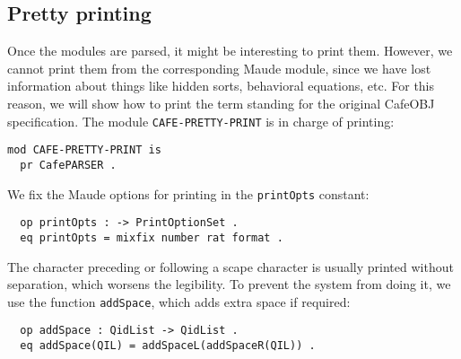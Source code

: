 \subsection{Pretty printing\label{subsec:pretty}}

Once the modules are parsed, it might be interesting to print them. However, we
cannot print them from the corresponding Maude module, since we have lost information
about things like hidden sorts, behavioral equations, etc. For this reason, we will
show how to print the term standing for the original CafeOBJ specification.
%
The module \verb"CAFE-PRETTY-PRINT" is in charge of printing:

{\codesize
\begin{verbatim}
mod CAFE-PRETTY-PRINT is
  pr CafePARSER .
\end{verbatim}
}

{\codesize
\begin{comment}
  vars QIL QIL' QIL'' QIL1 QIL2 QIL3 QIL4 QILL QILA PL : QidList .
  vars T T' T'' T''' T1 T2 T3 TW TW' : Term .
  vars ODS ODS' ODS'' VDS : OpDeclSet .
  vars St St' St'' St''' : String .
  vars ME ME' : ModuleExpression .
  vars EqS EqS' : EquationSet .
  vars TL TL' TL'' : TermList .
  var  SSDS : SubsortDeclSet .
  vars AtS AtS' : AttrSet .
  vars Q Q' GID QI : Qid .
  vars RS RS' : RuleSet .
  var  COND : Condition .
  vars M M' FM : Module .
  var  RP : ResultPair .
  var  IL : ImportList .
  var  MAS : MembAxSet .
  var  DB : Database .
  var  Ct : Constant .
  var  C : Condition .
  var  V : Variable .
  var  SS : SortSet .
  vars B B' : Bool .
  vars N N' : Nat .
  var  H : Header .
  var  S : Sort .
\end{comment}
}

We fix the Maude options for printing in the \verb"printOpts" constant:

{\codesize
\begin{verbatim}
  op printOpts : -> PrintOptionSet .
  eq printOpts = mixfix number rat format .
\end{verbatim}
}

The character preceding or following a scape character is usually printed without
separation, which worsens the legibility. To prevent the system from doing it, we
use the function \verb"addSpace", which adds extra space if required:

{\codesize
\begin{verbatim}
  op addSpace : QidList -> QidList .
  eq addSpace(QIL) = addSpaceL(addSpaceR(QIL)) .
\end{verbatim}
}


